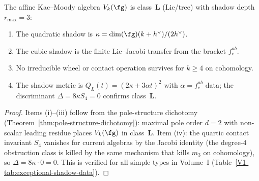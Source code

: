 \begin{proposition}
\label{prop:tw-hol-shadow-archetype}
The affine Kac--Moody algebra $V_k(\fg)$ is class~$\mathbf{L}$
\textup{(}Lie/tree\textup{)} with shadow depth $r_{\max} = 3$:
\begin{enumerate}[label=\textup{(\roman*)},nosep]
\item The quadratic shadow is
 $\kappa = \dim(\fg)(k + h^\vee)/(2h^\vee)$.
\item The cubic shadow is the finite Lie--Jacobi transfer from
 the bracket $f^{ab}_c$.
\item No irreducible wheel or contact operation survives for
 $k \ge 4$ on cohomology.
\item The shadow metric is $Q_L(t) = (2\kappa + 3\alpha t)^2$
 with $\alpha = f^{ab}_c$ data; the discriminant
 $\Delta = 8\kappa S_4 = 0$ confirms class~$\mathbf{L}$.
\end{enumerate}
\end{proposition}

\begin{proof}
Items (i)--(iii) follow from the pole-structure dichotomy
(Theorem~\ref{thm:pole-structure-dichotomy}): maximal pole order
$d = 2$ with non-scalar leading residue places $V_k(\fg)$ in
class~$\mathbf{L}$. Item (iv): the quartic contact invariant $S_4$ vanishes
for current algebras by the Jacobi identity (the degree-$4$
obstruction class is killed by the same mechanism that kills
$m_3$ on cohomology), so $\Delta = 8\kappa \cdot 0 = 0$.
This is verified for all simple types in Volume~I
(Table~\ref*{V1-tab:exceptional-shadow-data}).
\end{proof}

